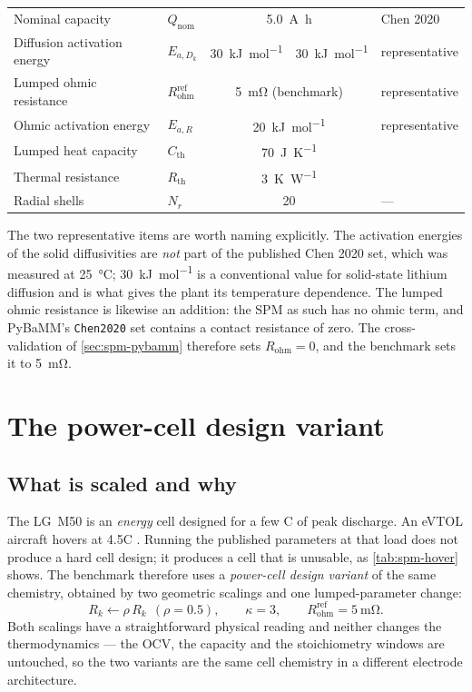 \begin{table}[H]
\begin{tabular}{llccl}
Nominal capacity & $Q_{\mathrm{nom}}$ & \multicolumn{2}{c}{\SI{5.0}{\ampere\hour}} & Chen 2020\\[1mm]
Diffusion activation energy & $E_{a,D_k}$ & \SI{30}{\kilo\joule\per\mole} & \SI{30}{\kilo\joule\per\mole} & representative\\
Lumped ohmic resistance & $R_{\mathrm{ohm}}^{\mathrm{ref}}$ & \multicolumn{2}{c}{\SI{5}{\milli\ohm} (benchmark)} & representative\\
Ohmic activation energy & $E_{a,R}$ & \multicolumn{2}{c}{\SI{20}{\kilo\joule\per\mole}} & representative\\
Lumped heat capacity & $C_{\mathrm{th}}$ & \multicolumn{2}{c}{\SI{70}{\joule\per\kelvin}} & \cite{lin2014thermal}\\
Thermal resistance & $R_{\mathrm{th}}$ & \multicolumn{2}{c}{\SI{3}{\kelvin\per\watt}} & \cite{lin2014thermal}\\
Radial shells & $N_r$ & \multicolumn{2}{c}{\num{20}} & ---\\
\bottomrule\end{tabular}
\end{table}

The two representative items are worth naming explicitly. The activation energies of the solid
diffusivities are \emph{not} part of the published Chen 2020 set, which was measured at
\SI{25}{\celsius}; \SI{30}{\kilo\joule\per\mole} is a conventional value for solid-state lithium
diffusion and is what gives the plant its temperature dependence. The lumped ohmic resistance is
likewise an addition: the SPM as such has no ohmic term, and PyBaMM's \texttt{Chen2020} set
contains a contact resistance of zero. The cross-validation of \cref{sec:spm-pybamm} therefore
sets $R_{\mathrm{ohm}}=0$, and the benchmark sets it to \SI{5}{\milli\ohm}.

\section{The power-cell design variant}
\label{sec:spm-power}

\subsection{What is scaled and why}
The LG~M50 is an \emph{energy} cell designed for a few C of peak discharge. An eVTOL aircraft
hovers at 4.5C \cite{yang2021evtol,fredericks2018vtol}. Running the published parameters at that
load does not produce a hard cell design; it produces a cell that is unusable, as
\cref{tab:spm-hover} shows. The benchmark therefore uses a \emph{power-cell design variant} of
the same chemistry, obtained by two geometric scalings and one lumped-parameter change:
\begin{equation}
R_k \leftarrow \rho\,R_k \ \ (\rho = 0.5),
\qquad
\kappa = 3,
\qquad
R_{\mathrm{ohm}}^{\mathrm{ref}} = \SI{5}{\milli\ohm}.
\label{eq:spm-scaling}
\end{equation}
Both scalings have a straightforward physical reading and neither changes the thermodynamics ---
the OCV, the capacity and the stoichiometry windows are untouched, so the two variants are the
same cell chemistry in a different electrode architecture.

